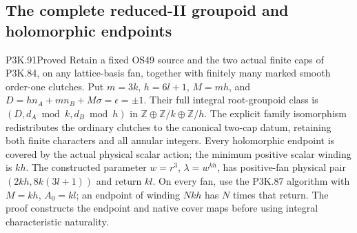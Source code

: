 \subsection{The complete reduced-II groupoid and holomorphic endpoints}
\begin{statement}{P3K.91}{Proved}
Retain a fixed OS49 source and the two actual finite caps of P3K.84, on any lattice-basis fan, together with finitely many marked smooth order-one clutches. Put \(m=3k\), \(h=6l+1\), \(M=mh\), and \(D=hn_A+mn_B+M\sigma=\epsilon=\pm1\). Their full integral root-groupoid class is \((D,d_A\bmod k,d_B\bmod h)\) in \(\mathbb Z\oplus\mathbb Z/k\oplus\mathbb Z/h\). The explicit family isomorphism redistributes the ordinary clutches to the canonical two-cap datum, retaining both finite characters and all annular integers. Every holomorphic endpoint is covered by the actual physical scalar action; the minimum positive scalar winding is \(kh\). The constructed parameter \(w=r^3\), \(\lambda=w^{kh}\), has positive-fan physical pair \((2kh,8k(3l+1))\) and return \(kl\). On every fan, use the P3K.87 algorithm with \(M=kh\), \(A_0=kl\); an endpoint of winding \(Nkh\) has \(N\) times that return. The proof constructs the endpoint and native cover maps before using integral characteristic naturality.
\end{statement}
